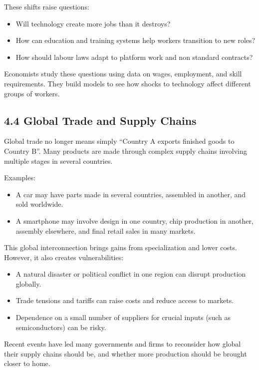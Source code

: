 \documentclass[12pt]{article}
\begin{document}
These shifts raise questions:

\begin{itemize}[noitemsep]
    \item Will technology create more jobs than it destroys?
    \item How can education and training systems help workers transition to new roles?
    \item How should labour laws adapt to platform work and non standard contracts?
\end{itemize}

Economists study these questions using data on wages, employment, and skill requirements. They build models to see how shocks to technology affect different groups of workers.

\subsection*{4.4 Global Trade and Supply Chains}

Global trade no longer means simply ``Country A exports finished goods to Country B''. Many products are made through complex supply chains involving multiple stages in several countries.

Examples:

\begin{itemize}[noitemsep]
    \item A car may have parts made in several countries, assembled in another, and sold worldwide.
    \item A smartphone may involve design in one country, chip production in another, assembly elsewhere, and final retail sales in many markets.
\end{itemize}

This global interconnection brings gains from specialization and lower costs. However, it also creates vulnerabilities:

\begin{itemize}[noitemsep]
    \item A natural disaster or political conflict in one region can disrupt production globally.
    \item Trade tensions and tariffs can raise costs and reduce access to markets.
    \item Dependence on a small number of suppliers for crucial inputs (such as semiconductors) can be risky.
\end{itemize}

Recent events have led many governments and firms to reconsider how global their supply chains should be, and whether more production should be brought closer to home.
\end{document}
